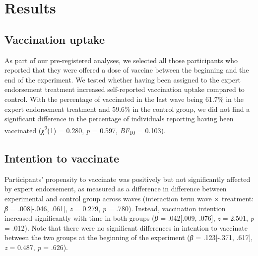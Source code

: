 \documentclass[authordate, empirical]{jote-new-article}
\begin{document}
\section{Results}



\subsection{ Vaccination uptake}



As part of our pre-registered analyses, we selected all those participants who reported that they were offered a dose of vaccine between the beginning and the end of the experiment. We tested whether having been assigned to the expert endorsement treatment increased self-reported vaccination uptake compared to control. With the percentage of vaccinated in the last wave being 61.7\% in the expert endorsement treatment and 59.6\% in the control group, we did not find a significant difference in the percentage of individuals reporting having been vaccinated (\emph{χ}\textsuperscript{2}(1) = 0.280, \emph{p }= 0.597, \emph{BF}\textsubscript{10 }= 0.103).



\subsection{Intention to vaccinate}



Participants' propensity to vaccinate was positively but not significantly affected by expert endorsement, as measured as a difference in difference between experimental and control group across waves (interaction term wave × treatment: \emph{β }= .008[-.046, .061], \emph{z }= 0.279, \emph{p }= .780). Instead, vaccination intention increased significantly with time in both groups (\emph{β }= .042[.009, .076], \emph{z }= 2.501, \emph{p }= .012). Note that there were no significant differences in intention to vaccinate between the two groups at the beginning of the experiment (\emph{β }= .123[-.371, .617], \emph{z }= 0.487, \emph{p }= .626).
\end{document}
